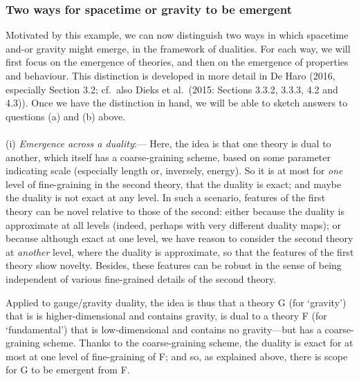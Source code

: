 \documentclass[12pt]{article}
\renewcommand{\^}[1]{\hat{#1}}
\begin{document}
\subsubsection{Two ways for spacetime or gravity to be emergent}\label{2ways}

Motivated by this example, we can now distinguish two ways in which spacetime and-or gravity might emerge, in the framework of dualities. For each way, we will first focus on the emergence of theories, and then on the emergence of properties and  behaviour. This distinction is developed in more detail in De Haro (2016, especially Section 3.2; cf.~also Dieks et al.~(2015: Sections 3.3.2, 3.3.3, 4.2 and 4.3)). Once we have the distinction in hand, we will be able to sketch answers to questions  (a) and (b) above.  \\
\\
(i) {\it Emergence across a duality}:--- Here, the idea is that one theory is dual to another, which itself has a coarse-graining scheme, based on some parameter indicating scale (especially length or, inversely, energy). So it is at most for {\em one} level of fine-graining in the second theory, that the duality is exact; and maybe the duality is not exact at any level. In such a scenario, features of the first theory can be novel relative to those of the second: either because the duality is approximate at all levels (indeed, perhaps with very different duality maps); or because although exact at one level, we have reason to consider the second theory  at {\em another} level, where the duality is approximate, so that the features of the first theory show novelty. Besides, these features can be robust in the sense of being independent of various fine-grained details of the second theory. 

Applied to gauge/gravity duality, the idea is thus that a theory G (for `gravity') that is is higher-dimensional and contains gravity, is dual to a theory F (for `fundamental') that is low-dimensional and contains no gravity---but has a coarse-graining scheme. Thanks to the coarse-graining scheme, the duality is exact for at most at one level of fine-graining of F; and so, as explained above, there is scope for G to be emergent from F.  
\end{document}
